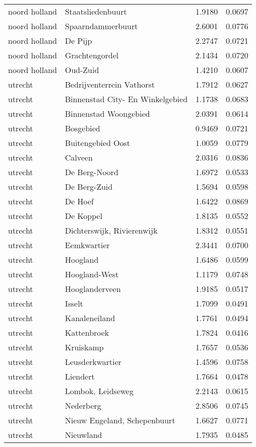 \begin{longtable}{llcc}
noord holland & Staatsliedenbuurt & 1.9180 & 0.0697 \\
noord holland & Spaarndammerbuurt & 2.6001 & 0.0776 \\
noord holland & De Pijp & 2.2747 & 0.0721 \\
noord holland & Grachtengordel & 2.1434 & 0.0720 \\
noord holland & Oud-Zuid & 1.4210 & 0.0607 \\
utrecht & Bedrijventerrein Vathorst & 1.7912 & 0.0627 \\
utrecht & Binnenstad City- En Winkelgebied & 1.1738 & 0.0683 \\
utrecht & Binnenstad Woongebied & 2.0391 & 0.0614 \\
utrecht & Bosgebied & 0.9469 & 0.0721 \\
utrecht & Buitengebied Oost & 1.0059 & 0.0779 \\
utrecht & Calveen & 2.0316 & 0.0836 \\
utrecht & De Berg-Noord & 1.6972 & 0.0533 \\
utrecht & De Berg-Zuid & 1.5694 & 0.0598 \\
utrecht & De Hoef & 1.6422 & 0.0869 \\
utrecht & De Koppel & 1.8135 & 0.0552 \\
utrecht & Dichterswijk, Rivierenwijk & 1.8312 & 0.0551 \\
utrecht & Eemkwartier & 2.3441 & 0.0700 \\
utrecht & Hoogland & 1.6486 & 0.0599 \\
utrecht & Hoogland-West & 1.1179 & 0.0748 \\
utrecht & Hooglanderveen & 1.9185 & 0.0517 \\
utrecht & Isselt & 1.7099 & 0.0491 \\
utrecht & Kanaleneiland & 1.7761 & 0.0494 \\
utrecht & Kattenbroek & 1.7824 & 0.0416 \\
utrecht & Kruiskamp & 1.7657 & 0.0536 \\
utrecht & Leusderkwartier & 1.4596 & 0.0758 \\
utrecht & Liendert & 1.7664 & 0.0478 \\
utrecht & Lombok, Leidseweg & 2.2143 & 0.0615 \\
utrecht & Nederberg & 2.8506 & 0.0745 \\
utrecht & Nieuw Engeland, Schepenbuurt & 1.6627 & 0.0771 \\
utrecht & Nieuwland & 1.7935 & 0.0485 \\

\end{longtable}
